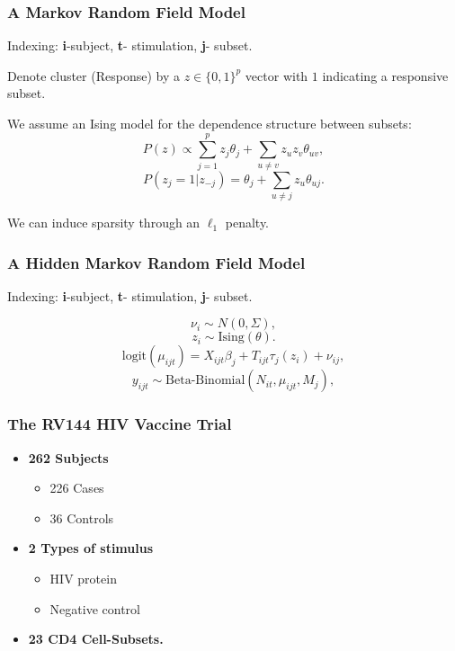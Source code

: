\documentclass{beamer}
\theoremstyle{definition}
\begin{document}

\begin{frame}
\frametitle{A Markov Random Field Model}
\begin{framed}
Indexing: \textbf{i}-subject, \textbf{t}- stimulation, \textbf{j}- subset.
\end{framed}

Denote cluster (Response) by a $z \in \{0,1\}^{p}$ vector with $1$ indicating a responsive subset.
\pause
\vspace{0.3 cm}

We assume an Ising model for the dependence structure between subsets:
$$
P(z) \propto \sum_{j=1}^{p} z_{j} \theta_j + \sum_{u\neq v} z_{u} z_{v} \theta_{uv},
$$$$
P(z_{j} = 1| z_{-j}) = \theta_{j} + \sum_{u\neq j } z_u \theta_{uj}.
$$

\pause
\vspace{0.3 cm}
We can induce sparsity through an $\ell_1$ penalty.

\end{frame}


\begin{frame}
\frametitle{A Hidden Markov Random Field Model}
\begin{framed}
Indexing: \textbf{i}-subject, \textbf{t}- stimulation, \textbf{j}- subset.
\end{framed}

$$
\nu_i \sim N(0, \Sigma),
$$$$
z_i \sim \text{Ising}(\theta).
$$$$
\text{logit}(\mu_{ijt}) = X_{ijt} \beta_j + T_{ijt}\tau_j(z_i) + \nu_{ij} ,
$$$$
y_{ijt} \sim \text{Beta-Binomial}(N_{it}, \mu_{ijt}, M_j) ,
$$
\end{frame}


\begin{frame}
\frametitle{The RV144 HIV Vaccine Trial}
\begin{itemize}
\item \textbf{262 Subjects}
	\begin{itemize}
	\item 226 Cases
	\item 36 Controls
	\end{itemize}
\vspace{0.2 cm}
\item \textbf{2 Types of stimulus} 
	\begin{itemize}
	\item HIV protein
	\item Negative control
	\end{itemize}
\vspace{0.2 cm}
\item \textbf{23 CD4 Cell-Subsets.} 
\end{itemize}
\end{frame}
\end{document}
